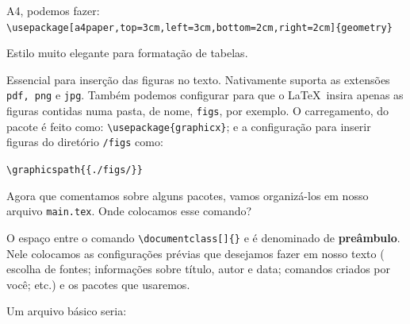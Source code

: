 \begin{description}
    A4, podemos fazer:\\
    {\small \Verb|\usepackage[a4paper,top=3cm,left=3cm,bottom=2cm,right=2cm]{geometry}|}
  \item[\hrefB{https://ctan.org/pkg/booktabs}{\sffamily booktabs}] Estilo muito 
   elegante para formatação de tabelas.
  \item[\hrefB{https://ctan.org/pkg/graphicx}{graphicx}] Essencial para inserção
    das figuras no texto.
    Nativamente suporta as extensões \texttt{pdf, png} e \texttt{jpg}.
    Também podemos configurar para que o \LaTeX\ insira apenas as figuras 
    contidas numa pasta, de nome, \texttt{figs}, por exemplo. 
    O carregamento, do pacote é feito como: \Verb|\usepackage{graphicx}|; e a 
    configuração para inserir figuras do diretório \texttt{/figs} como:
    \begin{center}
      \Verb|\graphicspath{{./figs/}}|
    \end{center}
\end{description}

Agora que comentamos sobre alguns pacotes, vamos organizá-los em nosso arquivo 
\texttt{main.tex}.
Onde colocamos esse comando?

O espaço entre o comando \Verb|\documentclass[]{}| e \Verb|| é 
denominado de \textsf{\textbf{preâmbulo}}.
Nele colocamos as configurações prévias que desejamos fazer em nosso texto (
escolha de fontes; informações sobre título, autor e data; comandos criados por 
você; etc.) e os pacotes que usaremos. 

Um arquivo básico seria: 


